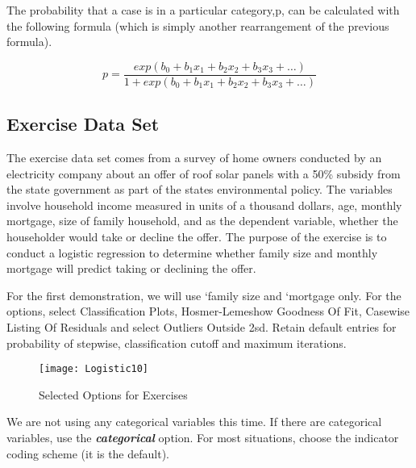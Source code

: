 \documentclass[a4paper,12pt]{article}
\begin{document}
The probability that a case is in a particular category,p, can be calculated with the following formula (which is simply another rearrangement of the previous formula).

\[p = \frac{exp(b_0 + b_1x_1 + b_2x_2 + b_3x_3 + \ldots)}{1 + exp(b_0 + b_1x_1 + b_2x_2 + b_3x_3 + \ldots)}\]

\newpage
\subsection{Exercise Data Set}
The exercise data set comes from a survey of home owners
conducted by an electricity company about an offer of roof solar panels with a 50\% subsidy
from the state government as part of the states environmental policy. The variables involve
household income measured in units of a thousand dollars, age, monthly mortgage, size of
family household, and as the dependent variable, whether the householder would take or decline the offer.
The purpose of the exercise is to conduct a logistic regression to determine whether family
size and monthly mortgage will predict taking or declining the offer.

For the first demonstration, we will use `family size and
`mortgage only. For the options, select Classification Plots, Hosmer-Lemeshow Goodness
Of Fit, Casewise Listing Of Residuals and select Outliers Outside 2sd. Retain default
entries for probability of stepwise, classification cutoff and maximum iterations.

\begin{figure}[h!]
\begin{center}
  \texttt{[image: Logistic10]}\\
  \caption{Selected Options for Exercises}
\end{center}
\end{figure}

We are not using any categorical variables this time. If there are categorical variables, use the \textbf{\textit{categorical}} option. For most situations, choose the indicator coding scheme (it is the
default).
\end{document}
